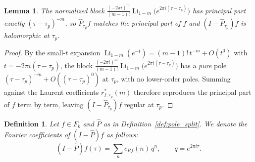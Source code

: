 \documentclass[11pt]{article}
\newtheorem{lemma}[theorem]{Lemma}
\newtheorem{definition}[theorem]{Definition}
\DeclareMathOperator{\Li}{Li}
\begin{document}
\begin{lemma}\label{lem:proj}
The normalized block $\frac{(-2\pi i)^m}{(m-1)!}\Li_{1-m}\big(e^{2\pi i(\tau-\tau_p)}\big)$ has
principal part exactly $(\tau-\tau_p)^{-m}$, so $\widehat P_{\tau_p}f$ matches the principal part of
$f$ and $(I-\widehat P_{\tau_p})f$ is holomorphic at $\tau_p$.
\end{lemma}
\begin{proof}
By the small-$t$ expansion $\Li_{1-m}(e^{-t})=(m-1)!\,t^{-m}+O(t^0)$ with $t=-2\pi i(\tau-\tau_p)$, the
block $\frac{(-2\pi i)^m}{(m-1)!}\Li_{1-m}\big(e^{2\pi i(\tau-\tau_p)}\big)$ has a \emph{pure} pole
$(\tau-\tau_p)^{-m}+O((\tau-\tau_p)^0)$ at $\tau_p$, with no lower-order poles. Summing against the Laurent
coefficients $r^*_{f,\tau_p}(m)$ therefore reproduces the principal part of $f$ term by term,
leaving $(I-\widehat P_{\tau_p})f$ regular at $\tau_p$.
\end{proof}

\begin{definition}\label{def:cRf}
Let $f \in F_k$ and $\widehat P$ as in Definition~\ref{def:pole_split}. We denote the Fourier
coefficients of $(I-\widehat P)f$ as follows:
\begin{equation}
(I-\widehat P)f(\tau)=\sum_n c_{Rf}(n)\,q^n,\qquad q=e^{2\pi i\tau}.
\end{equation}
\end{definition}
\end{document}
